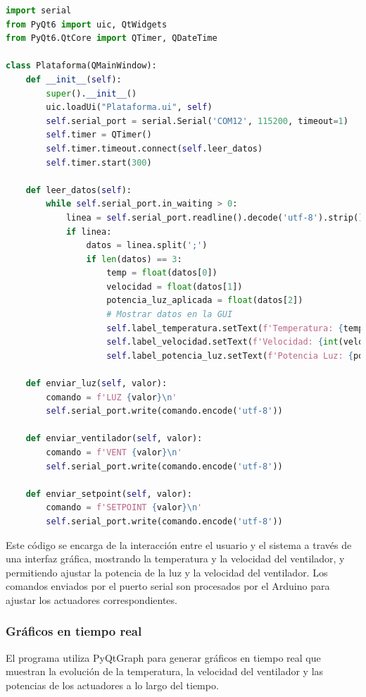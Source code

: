 \documentclass[spanish, a4paper, 11pt]{article}
\begin{document}
\begin{lstlisting}[language=Python]
import serial
from PyQt6 import uic, QtWidgets
from PyQt6.QtCore import QTimer, QDateTime

class Plataforma(QMainWindow):
    def __init__(self):
        super().__init__()
        uic.loadUi("Plataforma.ui", self)
        self.serial_port = serial.Serial('COM12', 115200, timeout=1)
        self.timer = QTimer()
        self.timer.timeout.connect(self.leer_datos)
        self.timer.start(300)

    def leer_datos(self):
        while self.serial_port.in_waiting > 0:
            linea = self.serial_port.readline().decode('utf-8').strip()
            if linea:
                datos = linea.split(';')
                if len(datos) == 3:
                    temp = float(datos[0])
                    velocidad = float(datos[1])
                    potencia_luz_aplicada = float(datos[2])
                    # Mostrar datos en la GUI
                    self.label_temperatura.setText(f'Temperatura: {temp:.1f} C')
                    self.label_velocidad.setText(f'Velocidad: {int(velocidad)} RPM')
                    self.label_potencia_luz.setText(f'Potencia Luz: {potencia_luz_aplicada:.0f}%')

    def enviar_luz(self, valor):
        comando = f'LUZ {valor}\n'
        self.serial_port.write(comando.encode('utf-8'))

    def enviar_ventilador(self, valor):
        comando = f'VENT {valor}\n'
        self.serial_port.write(comando.encode('utf-8'))

    def enviar_setpoint(self, valor):
        comando = f'SETPOINT {valor}\n'
        self.serial_port.write(comando.encode('utf-8'))
\end{lstlisting}

Este código se encarga de la interacción entre el usuario y el sistema a través de una interfaz gráfica, mostrando la temperatura y la velocidad del ventilador, y permitiendo ajustar la potencia de la luz y la velocidad del ventilador. Los comandos enviados por el puerto serial son procesados por el Arduino para ajustar los actuadores correspondientes.

\subsubsection*{Gráficos en tiempo real}

El programa utiliza PyQtGraph para generar gráficos en tiempo real que muestran la evolución de la temperatura, la velocidad del ventilador y las potencias de los actuadores a lo largo del tiempo.
\end{document}
